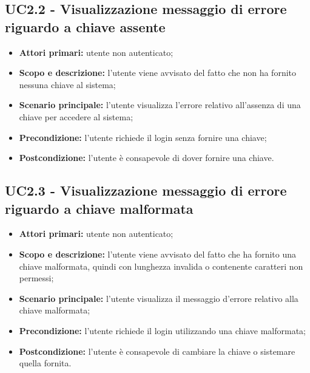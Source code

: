 \documentclass[AnalisiDeiRequisiti.tex]{subfiles}
\begin{document}
\subsection{UC2.2 - Visualizzazione messaggio di errore riguardo a chiave assente}
\begin{itemize}
	\item \textbf{Attori primari:} utente non autenticato;\\
	\item \textbf{Scopo e descrizione:} l'utente viene avvisato del fatto che non ha fornito nessuna chiave al sistema;\\
	\item \textbf{Scenario principale:} l'utente visualizza l'errore relativo all'assenza di una chiave per accedere al sistema;\\
	\item \textbf{Precondizione:} l'utente richiede il login senza fornire una chiave;\\
	\item \textbf{Postcondizione:} l'utente è consapevole di dover fornire una chiave. \\
\end{itemize}
\subsection{UC2.3 - Visualizzazione messaggio di errore riguardo a chiave malformata}
\begin{itemize}
	\item \textbf{Attori primari:} utente non autenticato;\\
	\item \textbf{Scopo e descrizione:} l'utente viene avvisato del fatto che ha fornito una chiave malformata, quindi con lunghezza invalida o contenente caratteri non permessi;\\
	\item \textbf{Scenario principale:} l'utente visualizza il messaggio d'errore relativo alla chiave malformata;\\
	\item \textbf{Precondizione:} l'utente richiede il login utilizzando una chiave malformata;\\
	\item \textbf{Postcondizione:} l'utente è consapevole di cambiare la chiave o sistemare quella fornita.\\
\end{itemize}
\end{document}
